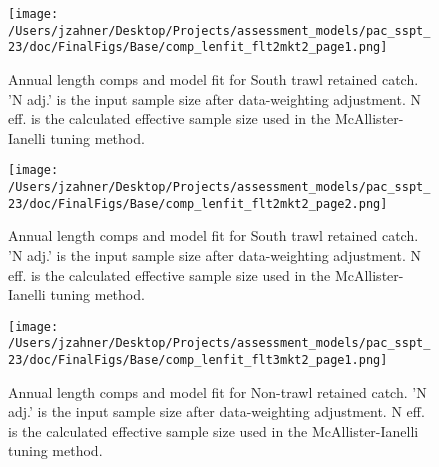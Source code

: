 \documentclass[11pt,
  letterpaper,
]{article}
\begin{document}
\begin{figure}
{\centering
\texttt{[image: /Users/jzahner/Desktop/Projects/assessment\_models/pac\_sspt\_23/doc/FinalFigs/Base/comp\_lenfit\_flt2mkt2\_page1.png]}
}
\caption{Annual length comps and model fit for South trawl retained catch. 'N adj.' is the input sample size after data-weighting adjustment. N eff. is the calculated effective sample size used in the McAllister-Ianelli tuning method.\label{fig:strawl_comps_1}}
\end{figure}

\begin{figure}
{\centering
\texttt{[image: /Users/jzahner/Desktop/Projects/assessment\_models/pac\_sspt\_23/doc/FinalFigs/Base/comp\_lenfit\_flt2mkt2\_page2.png]}
}
\caption{Annual length comps and model fit for South trawl retained catch. 'N adj.' is the input sample size after data-weighting adjustment. N eff. is the calculated effective sample size used in the McAllister-Ianelli tuning method.\label{fig:strawl_comps_2}}
\end{figure}

\begin{figure}
{\centering
\texttt{[image: /Users/jzahner/Desktop/Projects/assessment\_models/pac\_sspt\_23/doc/FinalFigs/Base/comp\_lenfit\_flt3mkt2\_page1.png]}
}
\caption{Annual length comps and model fit for Non-trawl retained catch. 'N adj.' is the input sample size after data-weighting adjustment. N eff. is the calculated effective sample size used in the McAllister-Ianelli tuning method.\label{fig:nontrawl_comps_1}}
\end{figure}
\end{document}
